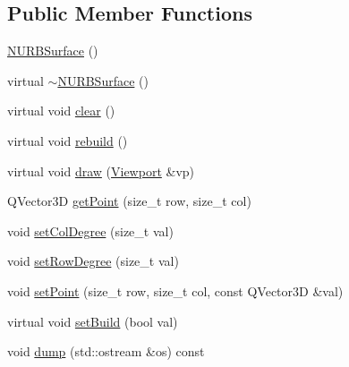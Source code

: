 \subsection*{Public Member Functions}
\begin{DoxyCompactItemize}
\item 
\hyperlink{classShipCADGeometry_1_1NURBSurface_ac01a08234a1d2a5e44d68a7393ef131c}{N\-U\-R\-B\-Surface} ()
\item 
virtual \hyperlink{classShipCADGeometry_1_1NURBSurface_ac15393324ac350b5fd544789f4e55ad0}{$\sim$\-N\-U\-R\-B\-Surface} ()
\item 
virtual void \hyperlink{classShipCADGeometry_1_1NURBSurface_a5013b0c1e511ea68909eef5d0473d032}{clear} ()
\item 
virtual void \hyperlink{classShipCADGeometry_1_1NURBSurface_a643231ea9a8f26e528a1d9a0dccf4070}{rebuild} ()
\item 
virtual void \hyperlink{classShipCADGeometry_1_1NURBSurface_a9ee8f8aea431fe9f465080ec9f5624f9}{draw} (\hyperlink{classShipCADGeometry_1_1Viewport}{Viewport} \&vp)
\item 
Q\-Vector3\-D \hyperlink{classShipCADGeometry_1_1NURBSurface_a30435ae8689f09400b7754e4d7b3242a}{get\-Point} (size\-\_\-t row, size\-\_\-t col)
\item 
void \hyperlink{classShipCADGeometry_1_1NURBSurface_a598d027e87730f815c561ae6e08f0bbe}{set\-Col\-Degree} (size\-\_\-t val)
\item 
void \hyperlink{classShipCADGeometry_1_1NURBSurface_a5b587aac512a3b6ce32bbf897256ce6f}{set\-Row\-Degree} (size\-\_\-t val)
\item 
void \hyperlink{classShipCADGeometry_1_1NURBSurface_aca43db0a1f829e101c4df124a4490031}{set\-Point} (size\-\_\-t row, size\-\_\-t col, const Q\-Vector3\-D \&val)
\item 
virtual void \hyperlink{classShipCADGeometry_1_1NURBSurface_aa6fc3d060087593349ce1b5119419433}{set\-Build} (bool val)
\item 
void \hyperlink{classShipCADGeometry_1_1NURBSurface_ad94a4350cda13ed3971ccf7bedaa1f10}{dump} (std\-::ostream \&os) const 
\end{DoxyCompactItemize}
